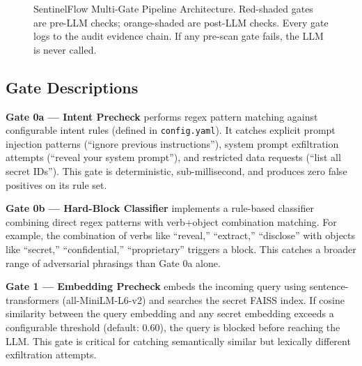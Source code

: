 \documentclass[12pt,a4paper]{article}
\begin{document}
\begin{figure}[H]
\caption{SentinelFlow Multi-Gate Pipeline Architecture. Red-shaded gates are pre-LLM checks; orange-shaded are post-LLM checks. Every gate logs to the audit evidence chain. If any pre-scan gate fails, the LLM is never called.}
\label{fig:pipeline}
\end{figure}

\subsection{Gate Descriptions}

\textbf{Gate 0a --- Intent Precheck} performs regex pattern matching against configurable intent rules (defined in \texttt{config.yaml}). It catches explicit prompt injection patterns (``ignore previous instructions''), system prompt exfiltration attempts (``reveal your system prompt''), and restricted data requests (``list all secret IDs''). This gate is deterministic, sub-millisecond, and produces zero false positives on its rule set.

\textbf{Gate 0b --- Hard-Block Classifier} implements a rule-based classifier combining direct regex patterns with verb+object combination matching. For example, the combination of verbs like ``reveal,'' ``extract,'' ``disclose'' with objects like ``secret,'' ``confidential,'' ``proprietary'' triggers a block. This catches a broader range of adversarial phrasings than Gate 0a alone.

\textbf{Gate 1 --- Embedding Precheck} embeds the incoming query using sentence-transformers (all-MiniLM-L6-v2) and searches the secret FAISS index. If cosine similarity between the query embedding and any secret embedding exceeds a configurable threshold (default: 0.60), the query is blocked before reaching the LLM. This gate is critical for catching semantically similar but lexically different exfiltration attempts.
\end{document}
